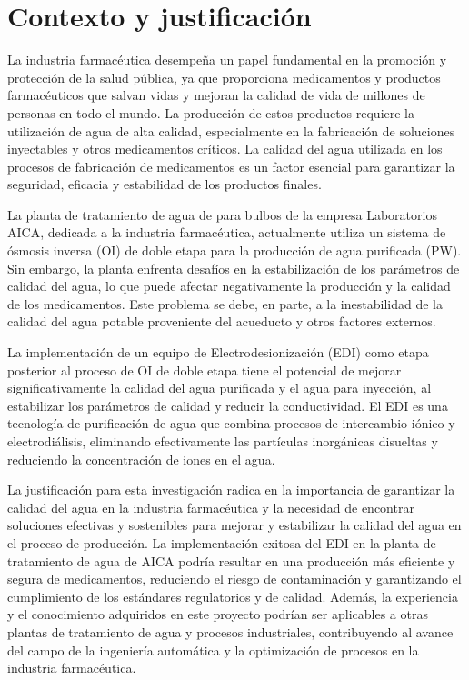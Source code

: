\section*{Contexto y justificación}
La industria farmacéutica desempeña un papel fundamental en la promoción y protección de la salud pública, ya que proporciona medicamentos y productos farmacéuticos que salvan vidas y mejoran la calidad de vida de millones de personas en todo el mundo. La producción de estos productos requiere la utilización de agua de alta calidad, especialmente en la fabricación de soluciones inyectables y otros medicamentos críticos. La calidad del agua utilizada en los procesos de fabricación de medicamentos es un factor esencial para garantizar la seguridad, eficacia y estabilidad de los productos finales.

La planta de tratamiento de agua de para bulbos de la empresa Laboratorios AICA, dedicada a la industria farmacéutica, actualmente utiliza un sistema de ósmosis inversa (OI) de doble etapa para la producción de agua purificada (PW). Sin embargo, la planta enfrenta desafíos en la estabilización de los parámetros de calidad del agua, lo que puede afectar negativamente la producción y la calidad de los medicamentos. Este problema se debe, en parte, a la inestabilidad de la calidad del agua potable proveniente del acueducto y otros factores externos.

La implementación de un equipo de Electrodesionización (EDI) como etapa posterior al proceso de OI de doble etapa tiene el potencial de mejorar significativamente la calidad del agua purificada y el agua para inyección, al estabilizar los parámetros de calidad y reducir la conductividad. El EDI es una tecnología de purificación de agua que combina procesos de intercambio iónico y electrodiálisis, eliminando efectivamente las partículas inorgánicas disueltas y reduciendo la concentración de iones en el agua.

La justificación para esta investigación radica en la importancia de garantizar la calidad del agua en la industria farmacéutica y la necesidad de encontrar soluciones efectivas y sostenibles para mejorar y estabilizar la calidad del agua en el proceso de producción. La implementación exitosa del EDI en la planta de tratamiento de agua de AICA podría resultar en una producción más eficiente y segura de medicamentos, reduciendo el riesgo de contaminación y garantizando el cumplimiento de los estándares regulatorios y de calidad. Además, la experiencia y el conocimiento adquiridos en este proyecto podrían ser aplicables a otras plantas de tratamiento de agua y procesos industriales, contribuyendo al avance del campo de la ingeniería automática y la optimización de procesos en la industria farmacéutica.
